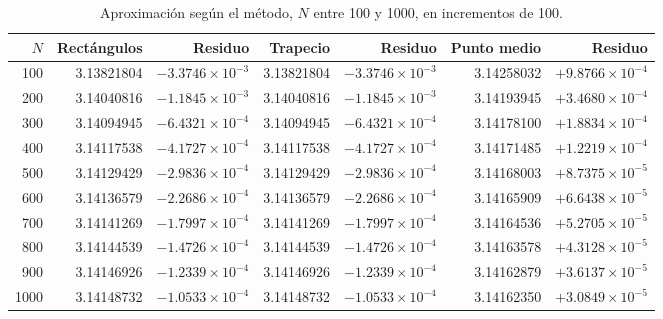 \begin{table}[H]
\centering
\caption{Aproximación según el método, \(N\) entre 100 y 1000, en incrementos de 100.}
\label{tab:e3_100a1000}
\footnotesize
\setlength{\tabcolsep}{3pt}
\begin{tabular}{r r r r r r r}
\toprule
\(N\) & Rectángulos & Residuo & Trapecio & Residuo & Punto medio & Residuo \\
\midrule
100   & 3.13821804 & \(-3.3746\times10^{-3}\) & 3.13821804 & \(-3.3746\times10^{-3}\) & 3.14258032 & \(+9.8766\times10^{-4}\) \\
200   & 3.14040816 & \(-1.1845\times10^{-3}\) & 3.14040816 & \(-1.1845\times10^{-3}\) & 3.14193945 & \(+3.4680\times10^{-4}\) \\
300   & 3.14094945 & \(-6.4321\times10^{-4}\) & 3.14094945 & \(-6.4321\times10^{-4}\) & 3.14178100 & \(+1.8834\times10^{-4}\) \\
400   & 3.14117538 & \(-4.1727\times10^{-4}\) & 3.14117538 & \(-4.1727\times10^{-4}\) & 3.14171485 & \(+1.2219\times10^{-4}\) \\
500   & 3.14129429 & \(-2.9836\times10^{-4}\) & 3.14129429 & \(-2.9836\times10^{-4}\) & 3.14168003 & \(+8.7375\times10^{-5}\) \\
600   & 3.14136579 & \(-2.2686\times10^{-4}\) & 3.14136579 & \(-2.2686\times10^{-4}\) & 3.14165909 & \(+6.6438\times10^{-5}\) \\
700   & 3.14141269 & \(-1.7997\times10^{-4}\) & 3.14141269 & \(-1.7997\times10^{-4}\) & 3.14164536 & \(+5.2705\times10^{-5}\) \\
800   & 3.14144539 & \(-1.4726\times10^{-4}\) & 3.14144539 & \(-1.4726\times10^{-4}\) & 3.14163578 & \(+4.3128\times10^{-5}\) \\
900   & 3.14146926 & \(-1.2339\times10^{-4}\) & 3.14146926 & \(-1.2339\times10^{-4}\) & 3.14162879 & \(+3.6137\times10^{-5}\) \\
1000  & 3.14148732 & \(-1.0533\times10^{-4}\) & 3.14148732 & \(-1.0533\times10^{-4}\) & 3.14162350 & \(+3.0849\times10^{-5}\) \\
\bottomrule
\end{tabular}
\end{table}

